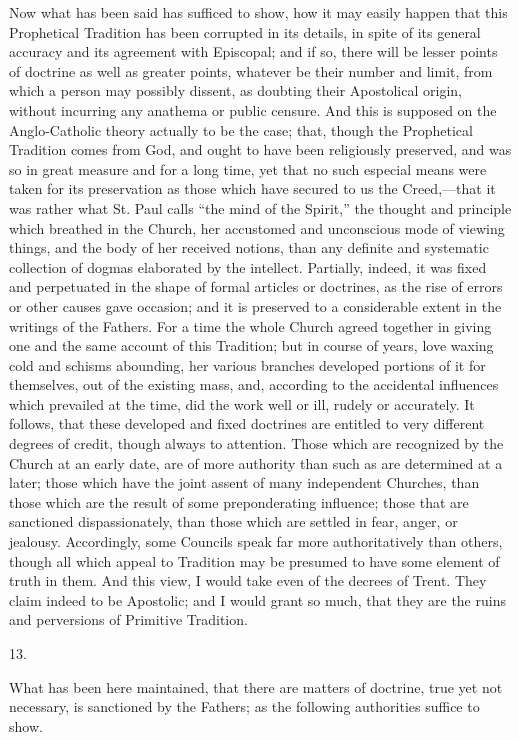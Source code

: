 Now what has been said has sufficed to show, how it may easily
happen that this Prophetical Tradition has been corrupted in its
details, in spite of its general accuracy and its agreement with
Episcopal; and if so, there will be lesser points of doctrine as well
as greater points, whatever be their number and limit, from which a
person may possibly dissent, as doubting their Apostolical origin,
without incurring any anathema or public censure. And this is supposed
on the Anglo-Catholic theory actually to be the case; that, though the
Prophetical Tradition comes from God, and ought to have been
religiously preserved, and was so in great measure and for a long
time, yet that no such especial means were taken for its preservation
as those which have secured to us the Creed,—that it was rather what
St. Paul calls ``the mind of the Spirit,'' the thought and
principle which breathed in the Church, her accustomed and unconscious
mode of viewing things, and the body of her received notions, than any
definite and systematic collection of dogmas elaborated by the
intellect. Partially, indeed, it was fixed and perpetuated in the
shape of formal articles or doctrines, as the rise of errors or other
causes gave occasion; and it is preserved to a considerable extent in
the writings of the Fathers. For a time the whole Church agreed
together in giving one and the same account of this Tradition; but in
course of years, love waxing cold and schisms abounding, her various
branches developed portions of it for themselves, out of the
existing mass, and, according to the accidental influences which
prevailed at the time, did the work well or ill, rudely or accurately.
It follows, that these developed and fixed doctrines are entitled to
very different degrees of credit, though always to attention. Those
which are recognized by the Church at an early date, are of more
authority than such as are determined at a later; those which have the
joint assent of many independent Churches, than those which are the
result of some preponderating influence; those that are sanctioned
dispassionately, than those which are settled in fear, anger, or
jealousy. Accordingly, some Councils speak far more authoritatively
than others, though all which appeal to Tradition may be presumed to
have some element of truth in them. And this view, I would take even
of the decrees of Trent. They claim indeed to be Apostolic; and I
would grant so much, that they are the ruins and perversions of
Primitive Tradition.

13.

What has been here maintained, that there are matters of doctrine,
true yet not necessary, is sanctioned by the Fathers; as the following
authorities suffice to show.

